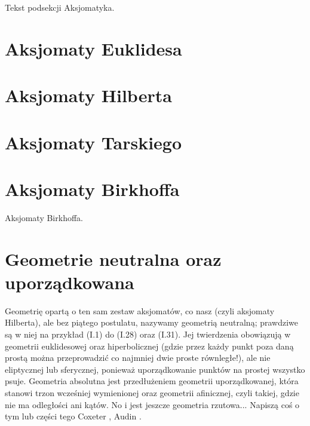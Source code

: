 %

Tekst podsekcji Aksjomatyka. \loremipsum

%
\section{Aksjomaty Euklidesa}

%

%
\section{Aksjomaty Hilberta}

%

%
\section{Aksjomaty Tarskiego}
\loremipsum
{}
\cite{greenberg_2010}
%

\section{Aksjomaty Birkhoffa}
Aksjomaty Birkhoffa.
\loremipsum

\section{Geometrie neutralna oraz uporządkowana}
Geometrię opartą o ten sam zestaw aksjomatów, co nasz (czyli aksjomaty Hilberta), ale bez piątego postulatu, nazywamy geometrią neutralną; prawdziwe są w niej na przykład (I.1) do (I.28) oraz (I.31).
Jej twierdzenia obowiązują w geometrii euklidesowej oraz hiperbolicznej (gdzie przez każdy punkt poza daną prostą można przeprowadzić co najmniej dwie proste równległe!), ale nie eliptycznej lub sferycznej, ponieważ uporządkowanie punktów na prostej wszystko psuje.
Geometria absolutna jest przedłużeniem geometrii uporządkowanej, która stanowi trzon wcześniej wymienionej oraz geometrii afinicznej, czyli takiej, gdzie nie ma odległości ani kątów.
No i jest jeszcze geometria rzutowa...
Napiszą coś o tym lub części tego Coxeter \cite[s. 193, 194]{coxeter_1967}, Audin \cite[s. 13]{audin_2003}.

